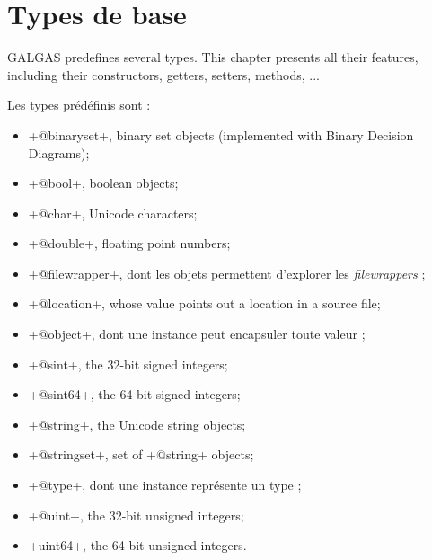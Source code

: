 
\chapter{Types de base}\label{predefinedTypes}

GALGAS predefines several types. This chapter presents all their features, including their constructors, getters, setters, methods, ...


Les types prédéfinis sont :
\begin{itemize}
\item \ggs+@binaryset+, binary set objects (implemented with Binary Decision Diagrams);
\item \ggs+@bool+, boolean objects;
\item \ggs+@char+, Unicode characters;
\item \ggs+@double+, floating point numbers;
\item \ggs+@filewrapper+, dont les objets permettent d'explorer les \emph{filewrappers} ;
\item \ggs+@location+, whose value points out a location in a source file;
\item \ggs+@object+, dont une instance peut encapsuler toute valeur ;
\item \ggs+@sint+, the 32-bit signed integers;
\item \ggs+@sint64+, the 64-bit signed integers;
\item \ggs+@string+, the Unicode string objects;
\item \ggs+@stringset+, set of \ggs+@string+ objects;
\item \ggs+@type+, dont une instance représente un type ;
\item \ggs+@uint+, the 32-bit unsigned integers;
\item \ggs+uint64+, the 64-bit unsigned integers.
\end{itemize}

